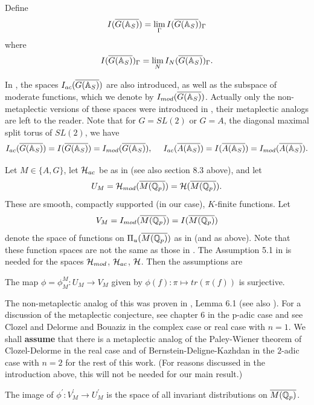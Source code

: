 Define
\begin{equation}
I(\overline{G({\Bbb{A}}_S)})
=\lim_{\Gamma}
I(\overline{G({\Bbb{A}}_S)})_\Gamma
\end{equation}
where
\[
I(\overline{G({\Bbb{A}}_S)})_\Gamma
=\lim_N
I_N(\overline{G({\Bbb{A}}_S)})_\Gamma .
\]

In \cite{A11}, the spaces $I_{ac}(\overline{G({\Bbb{A}}_S)})$ are also
introduced, as well as the subspace of moderate functions,
which we denote by $I_{mod}(\overline{G({\Bbb{A}}_S)})$.
Actually only the non-metaplectic versions of these spaces
were introduced in \cite{A11}, their metaplectic analogs are left
to the reader.
Note that for $G=SL(2)$ or $G=A$, the diagonal maximal split torus
of $SL(2)$, we have
\[
I_{ac}(\overline{G({\Bbb{A}}_S)})=I(\overline{G({\Bbb{A}}_S)})
=I_{mod}(\overline{G({\Bbb{A}}_S)}),
\ \ \ \ 
I_{ac}(\overline{A({\Bbb{A}}_S)})
=I(\overline{A({\Bbb{A}}_S)})
=I_{mod}(\overline{A({\Bbb{A}}_S)}).
\]

Let $M\in \{A,G\}$, let ${\cal{H}}_{ac}$ be as in
\cite{A11} (see also section 8.3 above),
and let 
\[
U_M={\cal{H}}_{mod}(\overline{M({\Bbb{Q}}_p)})
={\cal{H}}(\overline{M({\Bbb{Q}}_p)}) .
\]
These are smooth, compactly supported (in our case), $K$-finite
functions. Let 
\[
V_M=I_{mod}(\overline{M({\Bbb{Q}}_p)}) =I(\overline{M({\Bbb{Q}}_p)})
\]
denote the space of functions on $\Pi _u(\overline{M({\Bbb{Q}}_p)})$ as
in \cite{A11} (and as above).
Note that these function spaces are not the same as those in \cite{A6}.
The Assumption 5.1 in \cite{A6} is needed for
the spaces ${\cal H}_{mod}$, ${\cal H}_{ac}$, ${\cal H}$.
Then the assumptions are

\begin{conjecture}
The map $\phi=\phi_M^M :U_M\rightarrow V_M$ given by
$\phi (f):\pi \longmapsto tr(\pi (f)) $ is surjective.
\end{conjecture}

The non-metaplectic analog of this
was proven in \cite{A10}, Lemma 6.1 (see also \cite{BDK}).
For a discussion of the metaplectic conjecture, see chapter 6
in the p-adic case and see
Clozel and Delorme \cite{CD} and Bouaziz \cite{Bou} in the complex case
or real case with $n=1$. We shall {\bf assume} that there is a
metaplectic analog of the Paley-Wiener theorem of
Clozel-Delorme in the real case and of
Bernstein-Deligne-Kazhdan in the $2$-adic case
with $n=2$ for the rest
of this work. (For reasons discussed in the introduction above,
this will not be needed for our main result.)

\begin{conjecture}
The image of $\phi ^{\prime }:V_M^{\prime }\rightarrow U_M^{\prime }$ is the
space of all invariant distributions on
$\overline{M({\Bbb {Q}}_p)}$.
\end{conjecture}

